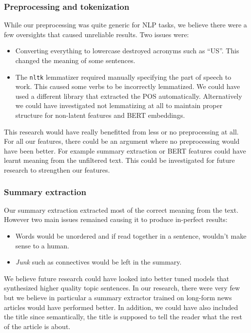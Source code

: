 \documentclass{article}
\begin{document}
\subsubsection*{Preprocessing and tokenization}\label{limitation:preprocessing}

While our preprocessing was quite generic for NLP tasks, we believe there were a few oversights that caused unreliable results. Two issues were:
\begin{itemize}
  \item Converting everything to lowercase destroyed acronyms such as ``US''. This changed the meaning of some sentences.
  \item The \verb|nltk| lemmatizer required manually specifying the part of speech to work. This caused some verbs to be incorrectly lemmatized. We could have used a different library that extracted the POS automatically. Alternatively we could have investigated not lemmatizing at all to maintain proper structure for non-latent features and BERT embeddings.
\end{itemize}

This research would have really benefitted from less or no preprocessing at all. For all our features, there could be an argument where no preprocessing would have been better. For example summary extraction or BERT features could have learnt meaning from the unfiltered text. This could be investigated for future research to strengthen our features.

\subsubsection*{Summary extraction}\label{limitation:summary-extraction}

Our summary extraction extracted most of the correct meaning from the text. However two main issues remained causing it to produce in-perfect results:
\begin{itemize}
  \item Words would be unordered and if read together in a sentence, wouldn't make sense to a human.
  \item \emph{Junk} such as connectives would be left in the summary.
\end{itemize}

We believe future research could have looked into better tuned models that synthesized higher quality topic sentences. In our research, there were very few but we believe in particular a summary extractor trained on long-form news articles would have performed better. In addition, we could have also included the title since semantically, the title is supposed to tell the reader what the rest of the article is about.
\end{document}
